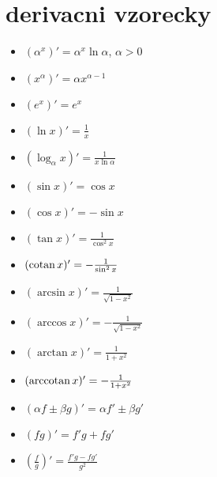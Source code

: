 \documentclass[a4paper]{article}
\def\cotan{\qopname\relax o{cotan}}
\def\arccotan{\qopname\relax o{arccotan}}
\begin{document}
\section*{derivacni vzorecky}
\begin{itemize}
	\item $(\alpha^x)' = \alpha^x\ln \alpha$, $\alpha>0$
	\item $(x^\alpha)' = \alpha x^{\alpha-1}$
	\item $(e^x)' = e^x$
	\item $(\ln x)' = \frac{1}{x}$
	\item $(\log_\alpha x)' = \frac{1}{x\ln \alpha}$
	\item $(\sin x)' = \cos x$
	\item $(\cos x)' = -\sin x$
	\item $(\tan x)' = \frac{1}{\cos^2 x}$
	\item $(\cotan x)' = -\frac{1}{\sin^2 x}$
	\item $(\arcsin x)' = \frac{1}{\sqrt{1-x^2}}$
	\item $(\arccos x)' = -\frac{1}{\sqrt{1-x^2}}$
	\item $(\arctan x)' = \frac{1}{1+x^2}$
	\item $(\arccotan x)' = -\frac{1}{1+x^2}$
\end{itemize}

\begin{itemize}
	\item $(\alpha f \pm \beta g)' = \alpha f' \pm \beta g'$
	\item $(fg)' = f'g + fg'$
	\item $(\frac{f}{g})' = \frac{f'g-fg'}{g^2}$
\end{itemize}
\end{document}
